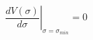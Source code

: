 \begin{equation}  \label{26}
\left.\frac{dV(\sigma)}{d\sigma}\right|_{\sigma=\sigma_{min}}=0
\end{equation}

